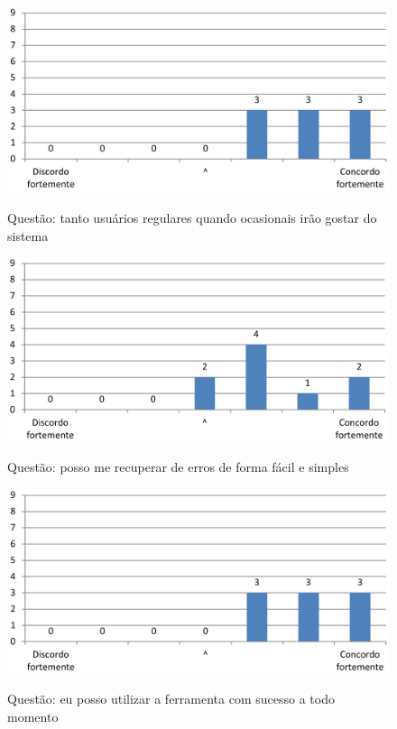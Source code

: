 \begin{figure}[h]
\centering
\caption{Questão: tanto usuários regulares quando ocasionais irão gostar do sistema}
\includegraphics[width=1.0\textwidth]{use/fu_irao_gostar.pdf} 
\label{fig:fu_irao_gostar} 
\end{figure}


\begin{figure}[h]
\centering
\caption{Questão: posso me recuperar de erros de forma fácil e simples}
\includegraphics[width=1.0\textwidth]{use/fu_facil_simples.pdf} 
\label{fig:fu_facil_simples} 
\end{figure}


\begin{figure}[h]
\centering
\caption{Questão: eu posso utilizar a ferramenta com sucesso a todo momento}
\includegraphics[width=1.0\textwidth]{use/fu_sucesso.pdf} 
\label{fig:fu_sucesso} 
\end{figure}

